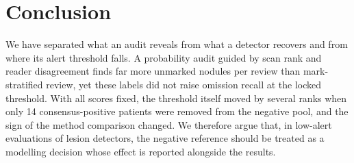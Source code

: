 \section{Conclusion}
\label{sec:conclusion}

We have separated what an audit reveals from what a detector recovers and from where its alert threshold falls. A probability audit guided by scan rank and reader disagreement finds far more unmarked nodules per review than mark-stratified review, yet these labels did not raise omission recall at the locked threshold. With all scores fixed, the threshold itself moved by several ranks when only 14 consensus-positive patients were removed from the negative pool, and the sign of the method comparison changed. We therefore argue that, in low-alert evaluations of lesion detectors, the negative reference should be treated as a modelling decision whose effect is reported alongside the results.
